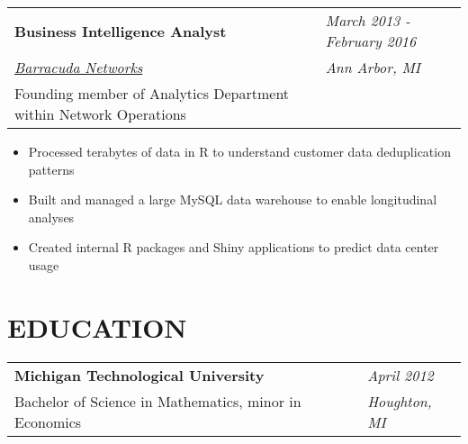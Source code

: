 \documentclass[margin,line]{res}
\begin{document}
\begin{resume}
  \begin{tabular}{p{4.6in} l}
    {\bf Business Intelligence Analyst}                       & \emph{March 2013 - February 2016} \\
    \href{https://www.barracuda.com/}{\it Barracuda Networks} & \emph{Ann Arbor, MI}              \\
    Founding member of Analytics Department within Network Operations
  \end{tabular}
  \vspace{2pt}
  \begin{itemize}\itemsep -2pt
    \item Processed terabytes of data in R to understand customer data deduplication patterns
    \item Built and managed a large MySQL data warehouse to enable longitudinal analyses
    \item Created internal R packages and Shiny applications to predict data center usage
  \end{itemize}
  
  
  \vspace{3pt}
  
  
  \section{EDUCATION}
  
  \begin{tabular}{p{4.6in} l}
    {\bf Michigan Technological University}                & \emph{April 2012}   \\
    Bachelor of Science in Mathematics, minor in Economics & \emph{Houghton, MI} \\
  \end{tabular}
  
  
\end{resume}
\end{document}
